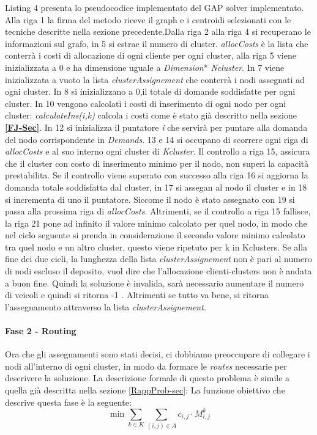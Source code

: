 \documentclass[]{article}
\begin{document}
Listing 4 presenta lo pseudocodice implementato del GAP solver implementato. Alla riga 1 la firma del metodo riceve il graph e i centroidi selezionati con le tecniche descritte nella sezione precedente.Dalla riga 2 alla riga 4 si recuperano le informazioni sul grafo, in 5 si estrae il numero di cluster. \textit{allocCosts} è la lista che conterrà i costi di allocazione di ogni cliente per ogni cluster, alla riga 5 viene inizializzata a 0 e ha dimensione uguale a \textit{Dimension}* \textit{Ncluster}. In 7 viene inizializzata a vuoto la lista \textit{clusterAssignement} che conterrà i nodi assegnati ad ogni cluster. In 8 si inizializzano a 0,il totale di domande soddisfatte per ogni cluster. In 10 vengono calcolati i costi di inserimento di ogni nodo per ogni cluster: \textit{calculateIns(i,k)} calcola i costi come è stato già descritto nella sezione \textbf{\ref{FJ-Sec}}. In 12 si inizializza il puntatore \emph{i} che servirà per puntare alla domanda del nodo corrispondente in \textit{Demands}. 13 e 14 si occupano di scorrere ogni riga di \textit{allocCosts} e al suo interno ogni cluster di \textit{Kcluster}. Il controllo a riga 15, assicura che il cluster con costo di inserimento minimo per il nodo, non superi la capacità prestabilita. Se il controllo viene superato con successo alla riga 16 si aggiorna la domanda totale soddisfatta dal cluster, in 17 si assegan al nodo il cluster e in 18 si incrementa di uno il puntatore. Siccome il nodo è stato assegnato con 19 si passa alla prossima riga di \textit{allocCosts}. Altrimenti, se il controllo a riga 15 fallisce, la riga 21 pone ad infinito il valore minimo calcolato per quel nodo, in modo che nel ciclo seguente si prenda in considerazione il secondo valore minimo calcolato tra quel nodo e un altro cluster, questo viene ripetuto per k in Kclusters.
Se alla fine dei due cicli, la lunghezza della lista \textit{clusterAssignement} non è pari al numero di nodi escluso il deposito, vuol dire che l'allocazione clienti-clusters non è andata a buon fine. Quindi la soluzione è invalida, sarà necessario aumentare il numero di veicoli e quindi si ritorna -1 . Altrimenti se tutto va bene, si ritorna l'assegnamento attraverso la lista \textit{clusterAssignement}. 

\paragraph{Fase 2 - Routing } \hfill

Ora che gli assegnamenti sono stati decisi, ci dobbiamo preoccupare di collegare i nodi all'interno di ogni cluster, in modo da formare le \emph{routes} necessarie per descrivere la soluzione. La descrizione formale di questo problema è simile a quella già descritta nella sezione  \ref{RappProb-sec}: La funzione obiettivo che descrive questa fase è la seguente:
\begin{equation} \label{objF2}
\min \sum_{k \in K} \sum_{(i,j) \in A} c_{i,j} \cdot M_{i,j}^k 
\end{equation}
\end{document}
